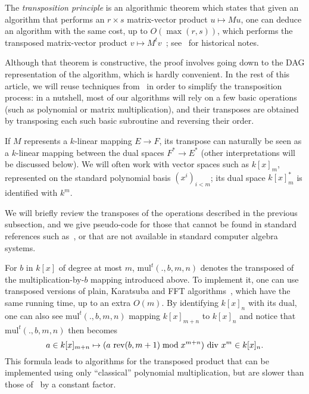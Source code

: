 \documentclass{sig-alternate}
\def\mul {\ensuremath{\mathrm{mul}}}
\def\rev {\ensuremath{\mathrm{rev}}}
\newcommand{\ang}[1]{\langle#1\rangle}
\begin{document}
The {\em transposition principle} is an algorithmic theorem which
states that given an algorithm that performs an $r \times s$
matrix-vector product $u \mapsto M u$, one can deduce an algorithm
with the same cost, up to $O(\max(r,s))$, which performs the
transposed matrix-vector product $v \mapsto M^t
v$~\cite[Chapter~13]{burgisser+clausen-shokrollahi}; see~\cite{Ka2K}
for historical notes.

Although that theorem is constructive, the proof involves going down
to the DAG representation of the algorithm, which is hardly
convenient.  In the rest of this article, we will reuse techniques
from~\cite{bostan+lecerf+schost:tellegen} in order to simplify the
transposition process: in a nutshell, most of our algorithms will rely
on a few basic operations (such as polynomial or matrix
multiplication), and their transposes are obtained by transposing each
such basic subroutine and reversing their order.

If $M$ represents a $k$-linear mapping $E \to F$, its transpose can
naturally be seen as a $k$-linear mapping between the dual spaces $F^*
\to E^*$ (other interpretations will be discussed below). We will
often work with vector spaces such as $k[x]_m$, represented on the
standard polynomial basis $(x^i)_{i<m}$; its dual space $k[x]_m^\ast$
is identified with $k^m$.


We will briefly review the transposes of the operations described in
the previous subsection, and we give pseudo-code for those that cannot
be found in standard references such as~\cite{vzGG}, or that are not
available in standard computer algebra systems.

For $b$ in $k[x]$ of degree at most $m$, $\mul^t(.,b,m,n)$ denotes the
transposed of the multiplication-by-$b$ mapping introduced above. To
implement it, one can use transposed versions of plain, Karatsuba and
FFT
algorithms~\cite{bostan+lecerf+schost:tellegen,hanrot+quercia+zimmermann},
which have the same running time, up to an extra $O(m)$.  By
identifying $k[x]_n$ with its dual, one can also see $\mul^t(.,b,m,n)$
mapping $k[x]_{m+n}$ to $k[x]_{n}$ and notice that $\mul^t(.,b,m,n)$
then becomes $$a \in k[x]_{m+n} \mapsto (a\ \rev(b,m+1) \bmod
x^{m+n}){\rm~div~}x^{m} \in k[x]_n.$$ This formula leads to algorithms
for the transposed product that can be implemented using only
``classical'' polynomial multiplication, but are slower than those
of~\cite{bostan+lecerf+schost:tellegen,hanrot+quercia+zimmermann} by a
constant factor.
\end{document}
